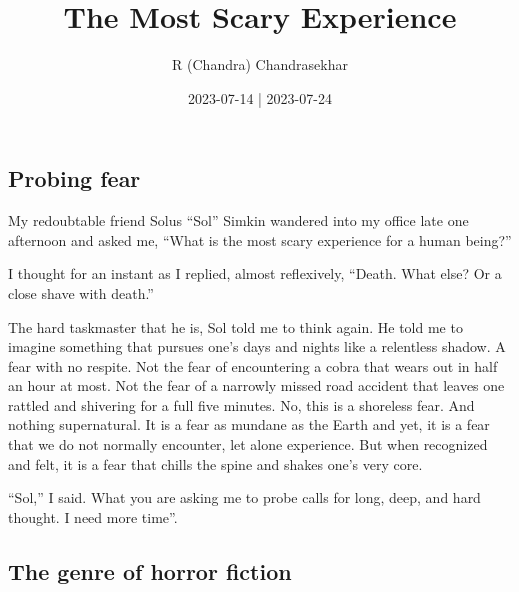 \documentclass[
  a4paper,
]{article}
\title{The Most Scary Experience}
\author{R (Chandra) Chandrasekhar}
\date{2023-07-14 | 2023-07-24}
\begin{document}
\maketitle

\thispagestyle{empty}


\hypertarget{probing-fear}{%
\subsection{Probing fear}\label{probing-fear}}

My redoubtable friend Solus ``Sol'' Simkin wandered into my office late
one afternoon and asked me, ``What is the most scary experience for a
human being?''

I thought for an instant as I replied, almost reflexively, ``Death. What
else? Or a close shave with death.''

The hard taskmaster that he is, Sol told me to think again. He told me
to imagine something that pursues one's days and nights like a
relentless shadow. A fear with no respite. Not the fear of encountering
a cobra that wears out in half an hour at most. Not the fear of a
narrowly missed road accident that leaves one rattled and shivering for
a full five minutes. No, this is a shoreless fear. And nothing
supernatural. It is a fear as mundane as the Earth and yet, it is a fear
that we do not normally encounter, let alone experience. But when
recognized and felt, it is a fear that chills the spine and shakes one's
very core.

``Sol,'' I said. What you are asking me to probe calls for long, deep,
and hard thought. I need more time''.

\hypertarget{the-genre-of-horror-fiction}{%
\subsection{The genre of horror
fiction}\label{the-genre-of-horror-fiction}}
\end{document}
